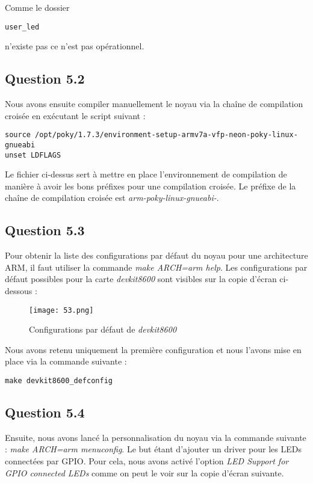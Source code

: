 \documentclass[a4paper,12pt]{report}
\begin{document}
Comme le dossier 
\begin{verbatim} 
user_led 
\end{verbatim} 
n'existe pas ce n'est pas opérationnel.

\subsection{Question 5.2}

Nous avons ensuite compiler manuellement le noyau via la chaîne de compilation croisée en exécutant le script suivant :
\begin{verbatim} 
source /opt/poky/1.7.3/environment-setup-armv7a-vfp-neon-poky-linux-gnueabi
unset LDFLAGS
\end{verbatim} 

Le fichier ci-dessus sert à mettre en place l'environnement de compilation de manière à avoir les bons préfixes pour une compilation croisée.
Le préfixe de la chaîne de compilation croisée est \textit{arm-poky-linux-gnueabi-}.

\subsection{Question 5.3}

Pour obtenir la liste des configurations par défaut du noyau pour une architecture ARM, il faut utiliser la commande \textit{make ARCH=arm help}.
Les configurations par défaut possibles pour la carte \textit{devkit8600} sont visibles sur la copie d'écran ci-dessous :

\begin{figure}[h]
	\centering
		\texttt{[image: 53.png]}
		\caption{Configurations par défaut de \textit{devkit8600}}
\end{figure}

Nous avons retenu uniquement la première configuration et nous l'avons mise en place via la commande suivante : 
\begin{verbatim} 
make devkit8600_defconfig
\end{verbatim} 

\subsection{Question 5.4}

Ensuite, nous avons lancé la personnalisation du noyau via la commande suivante : \textit{make ARCH=arm menuconfig}.
Le but étant d'ajouter un driver pour les LEDs connectées par GPIO.
Pour cela, nous avons activé l'option \textit{LED Support for GPIO connected LEDs} comme on peut le voir sur la copie d'écran suivante.
\end{document}
